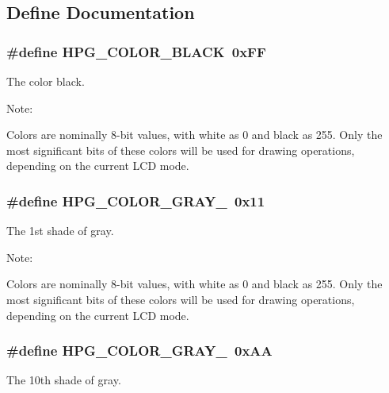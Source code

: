 \subsection{Define Documentation}
\subsubsection{\setlength{\rightskip}{0pt plus 5cm}\#define HPG\_\-COLOR\_\-BLACK\ 0x\-FF}\label{hpgraphics_8h_a17}


The color black.

\begin{Desc}
\item[Note: ]\par
Colors are nominally 8-bit values, with white as 0 and black as 255. Only the most significant bits of these colors will be used for drawing operations, depending on the current LCD mode. \end{Desc}
\subsubsection{\setlength{\rightskip}{0pt plus 5cm}\#define HPG\_\-COLOR\_\-GRAY\_\ 0x11}\label{hpgraphics_8h_a3}


The 1st shade of gray.

\begin{Desc}
\item[Note: ]\par
Colors are nominally 8-bit values, with white as 0 and black as 255. Only the most significant bits of these colors will be used for drawing operations, depending on the current LCD mode. \end{Desc}
\subsubsection{\setlength{\rightskip}{0pt plus 5cm}\#define HPG\_\-COLOR\_\-GRAY\_\ 0x\-AA}\label{hpgraphics_8h_a12}


The 10th shade of gray.

